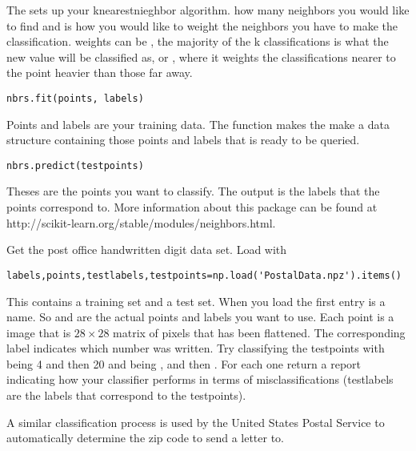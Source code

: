 The  sets up your knearestnieghbor algorithm.  how many neighbors you would like to find  and  is how you would like to weight the neighbors you have to make the classification. weights can be , the majority of the k classifications is what the new value will be classified as, or , where it weights the classifications nearer to the point heavier than those far away. 

\begin{lstlisting}
nbrs.fit(points, labels)
\end{lstlisting}
Points and labels are your training data. The  function makes the  make a data structure containing those points and labels that is ready to be queried. 

\begin{lstlisting}
nbrs.predict(testpoints)
\end{lstlisting}

Theses are the points you want to classify. The output is the labels that the points correspond to. More information about this package can be found at http://scikit-learn.org/stable/modules/neighbors.html.
\begin{problem}

Get the post office handwritten digit data set. Load with
\begin{lstlisting}
labels,points,testlabels,testpoints=np.load('PostalData.npz').items()
\end{lstlisting}
This contains a training set and a test set. When you load the first entry is a name. So  and  are the actual points and labels you want to use. Each point is a  image that is $28 \times 28$ matrix of pixels that has been flattened. The corresponding label indicates which number was written.  Try classifying the testpoints with  being 4 and then 20 and  being , and then . For each one return a report indicating how your classifier performs in terms of misclassifications (testlabels are the labels that correspond to the testpoints). 

A similar classification process is used by the United States Postal Service to automatically determine the zip code to send a letter to.

\end{problem}


